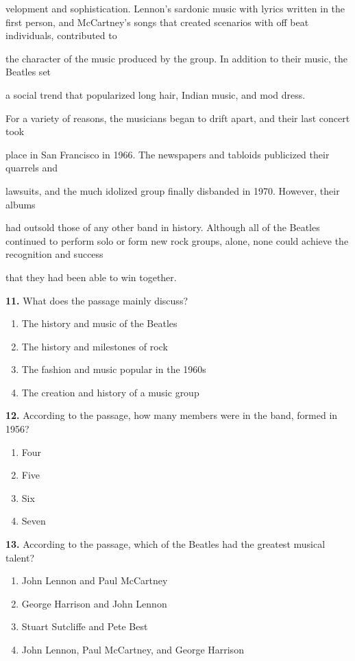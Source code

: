 \documentclass[12pt]{article}
\begin{document}
velopment and sophistication. Lennon's sardonic music with lyrics written in the first person, and McCartney's songs that created scenarios with off beat individuals, contributed to\par
the character of the music produced by the group. In addition to their music, the Beatles set\par
a social trend that popularized long hair, Indian music, and mod dress.\par
For a variety of reasons, the musicians began to drift apart, and their last concert took\par
place in San Francisco in 1966. The newspapers and tabloids publicized their quarrels and\par
lawsuits, and the much idolized group finally disbanded in 1970. However, their albums\par
had outsold those of any other band in history. Although all of the Beatles continued to perform solo or form new rock groups, alone, none could achieve the recognition and success\par
that they had been able to win together.\par
\endgroup
\medskip
\noindent\textbf{11.} What does the passage mainly discuss?
\begin{enumerate}[label=(\Alph*),leftmargin=*,itemsep=0.2em]
\item The history and music of the Beatles
\item The history and milestones of rock
\item The fashion and music popular in the 1960s
\item The creation and history of a music group
\end{enumerate}
\par
\vspace{0.25\baselineskip}
\noindent\textbf{12.} According to the passage, how many members were in the band, formed in 1956?
\begin{enumerate}[label=(\Alph*),leftmargin=*,itemsep=0.2em]
\item Four
\item Five
\item Six
\item Seven
\end{enumerate}
\par
\vspace{0.25\baselineskip}
\noindent\textbf{13.} According to the passage, which of the Beatles had the greatest musical talent?
\begin{enumerate}[label=(\Alph*),leftmargin=*,itemsep=0.2em]
\item John Lennon and Paul McCartney
\item George Harrison and John Lennon
\item Stuart Sutcliffe and Pete Best
\item John Lennon, Paul McCartney, and George Harrison
\end{enumerate}
\end{document}
